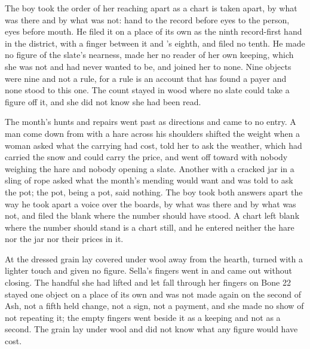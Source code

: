 The boy took the order of her reaching apart as a chart is taken apart, by what was there and by what was not: hand to the record before eyes to the person, eyes before mouth. He filed it on a place of its own as the ninth record-first hand in the district, with a finger between it and 's eighth, and filed no tenth. He made no figure of the slate's nearness, made her no reader of her own keeping, which she was not and had never wanted to be, and joined her to none. Nine objects were nine and not a rule, for a rule is an account that has found a payer and none stood to this one. The count stayed in wood where no slate could take a figure off it, and she did not know she had been read.

The month's hunts and repairs went past as directions and came to no entry. A man come down from  with a hare across his shoulders shifted the weight when a woman asked what the carrying had cost, told her to ask the weather, which had carried the snow and could carry the price, and went off toward  with nobody weighing the hare and nobody opening a slate. Another with a cracked jar in a sling of rope asked what the month's mending would want and was told to ask the pot; the pot, being a pot, said nothing. The boy took both answers apart the way he took apart a voice over the boards, by what was there and by what was not, and filed the blank where the number should have stood. A chart left blank where the number should stand is a chart still, and he entered neither the hare nor the jar nor their prices in it.

\scenebreak

At  the dressed grain lay covered under wool away from the hearth, turned with a lighter touch and given no figure. Sella's fingers went in and came out without closing. The handful she had lifted and let fall through her fingers on Bone 22 stayed one object on a place of its own and was not made again on the second of Ash, not a fifth held change, not a sign, not a payment, and she made no show of not repeating it; the empty fingers went beside it as a keeping and not as a second. The grain lay under wool and did not know what any figure would have cost.

